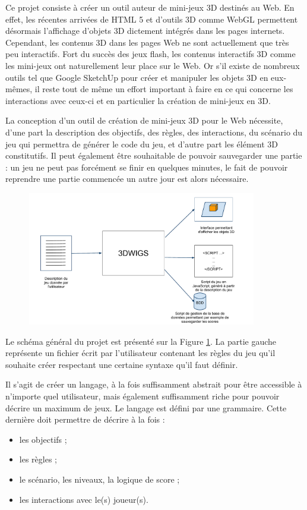 Ce projet consiste à créer un outil auteur de mini-jeux 3D destinés au Web.
En effet, les récentes arrivées de HTML 5 et d'outils 3D comme WebGL permettent désormais l'affichage d'objets 3D dictement
intégrés dans les pages internets.
Cependant, les contenus 3D dans les pages Web ne sont actuellement que très peu interactifs.
Fort du succès des jeux flash, les contenus interactifs 3D comme les mini-jeux ont naturellement leur place sur le Web.
Or s'il existe de nombreux outils tel que Google SketchUp pour créer et manipuler les objets 3D en eux-mêmes,
il reste tout de même un effort important à faire en ce qui concerne les interactions avec ceux-ci et en particulier la création de mini-jeux en 3D.

\vspace{0.5cm}

La conception d'un outil de création de mini-jeux 3D pour le Web nécessite, d'une part la description des objectifs, des règles, des interactions, 
du scénario du jeu qui permettra de générer le code du jeu, et d'autre part les élément 3D constitutifs.
Il peut également être souhaitable de pouvoir sauvegarder une partie :
un jeu ne peut pas forcément se finir en quelques minutes, le fait de pouvoir reprendre une partie commencée un autre jour est alors nécessaire.

\begin{figure}[h]
 \centering
 \includegraphics[width=10cm]{img/schema_general}
 \label{fig:schemaprojet}
\end{figure}

Le schéma général du projet est présenté sur la Figure \ref{fig:schemaprojet}.
La partie gauche représente un fichier écrit par l'utilisateur contenant les règles du jeu qu'il souhaite créer respectant
une certaine syntaxe qu'il faut définir.

Il s'agit de créer un langage, à la fois suffisamment abstrait pour être accessible à n'importe quel utilisateur, mais également suffisamment riche
pour pouvoir décrire un maximum de jeux.
Le langage est défini par une grammaire.
Cette dernière doit permettre de décrire à la fois :
\begin{itemize}
 \item les objectifs ;
 \item les règles ;
 \item le scénario, les niveaux, la logique de score ;
 \item les interactions avec le(s) joueur(s).
\end{itemize}

